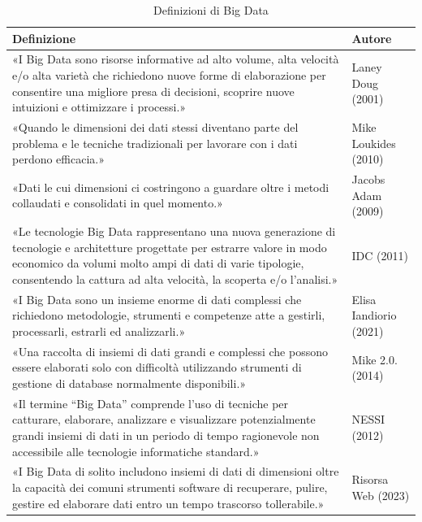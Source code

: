 \begin{longtable}{|p{11cm}|p{3cm}|}
    \caption{Definizioni di Big Data} \\
    \hline
    \textbf{Definizione} & \textbf{Autore} \\
    \hline
    \endfirsthead
    «I Big Data sono risorse informative ad alto volume, alta velocità e/o alta varietà che richiedono nuove forme di elaborazione per consentire una migliore presa di decisioni, scoprire nuove intuizioni e ottimizzare i processi.» 
    & Laney Doug (2001) \cite{laney_3d_data_management}\\
    \hline
    «Quando le dimensioni dei dati stessi diventano parte del problema e le tecniche tradizionali per lavorare con i dati perdono efficacia.» 
    & Mike Loukides (2010) \cite{loukides_data_science}\\
    \hline
    «Dati le cui dimensioni ci costringono a guardare oltre i metodi collaudati e consolidati in quel momento.» 
    & Jacobs Adam (2009) \cite{jacobs_big_data}\\
    \hline
    «Le tecnologie Big Data rappresentano una nuova generazione di tecnologie e architetture progettate per estrarre valore in modo economico da volumi molto ampi di dati di varie tipologie, consentendo la cattura ad alta velocità, la scoperta e/o l'analisi.» 
    & IDC (2011) \cite{idc_big_data}\\
    \hline
    «I Big Data sono un insieme enorme di dati complessi che richiedono metodologie, strumenti e competenze atte a gestirli, processarli, estrarli ed analizzarli.» 
    & Elisa Iandiorio (2021) \cite{iandorio_big_data}\\
    \hline
    «Una raccolta di insiemi di dati grandi e complessi che possono essere elaborati solo con difficoltà utilizzando strumenti di gestione di database normalmente disponibili.» 
    & Mike 2.0. (2014) \cite{mike_big_data}\\
    \hline
    «Il termine “Big Data” comprende l'uso di tecniche per catturare, elaborare, analizzare e visualizzare potenzialmente grandi insiemi di dati in un periodo di tempo ragionevole non accessibile alle tecnologie informatiche standard.» 
    & NESSI (2012) \cite{nessi_big_data}\\
    \hline
    «I Big Data di solito includono insiemi di dati di dimensioni oltre la capacità dei comuni strumenti software di recuperare, pulire, gestire ed elaborare dati entro un tempo trascorso tollerabile.» 
    & Risorsa Web (2023) \cite{wikipedia_big_data}\\

\end{longtable}
